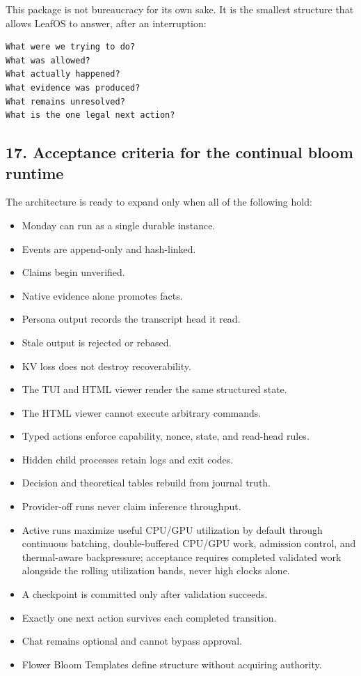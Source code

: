 This package is not bureaucracy for its own sake. It is the smallest structure
that allows LeafOS to answer, after an interruption:

\begin{verbatim}
What were we trying to do?
What was allowed?
What actually happened?
What evidence was produced?
What remains unresolved?
What is the one legal next action?
\end{verbatim}

\subsection{17. Acceptance criteria for the continual bloom runtime}

The architecture is ready to expand only when all of the following hold:

\begin{itemize}
\item
  Monday can run as a single durable instance.
\item
  Events are append-only and hash-linked.
\item
  Claims begin unverified.
\item
  Native evidence alone promotes facts.
\item
  Persona output records the transcript head it read.
\item
  Stale output is rejected or rebased.
\item
  KV loss does not destroy recoverability.
\item
  The TUI and HTML viewer render the same structured state.
\item
  The HTML viewer cannot execute arbitrary commands.
\item
  Typed actions enforce capability, nonce, state, and read-head rules.
\item
  Hidden child processes retain logs and exit codes.
\item
  Decision and theoretical tables rebuild from journal truth.
\item
  Provider-off runs never claim inference throughput.
\item
  Active runs maximize useful CPU/GPU utilization by default through continuous
  batching, double-buffered CPU/GPU work, admission control, and thermal-aware
  backpressure; acceptance requires completed validated work alongside the
  rolling utilization bands, never high clocks alone.
\item
  A checkpoint is committed only after validation succeeds.
\item
  Exactly one next action survives each completed transition.
\item
  Chat remains optional and cannot bypass approval.
\item
  Flower Bloom Templates define structure without acquiring authority.
\end{itemize}

